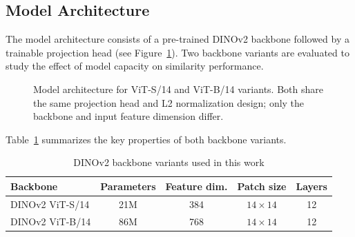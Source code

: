 \documentclass[
    english,
]{VUMIFPSbakalaurinis}
\begin{document}
\subsection{Model Architecture}

The model architecture consists of a pre-trained DINOv2 backbone followed by a trainable projection head (see Figure~\ref{fig:architecture}). Two backbone variants are evaluated to study the effect of model capacity on similarity performance.

\begin{figure}[H]
\centering
{}
\caption{Model architecture for ViT-S/14 and ViT-B/14 variants. Both share the same projection head and L2 normalization design; only the backbone and input feature dimension differ.}
\label{fig:architecture}
\end{figure}

Table~\ref{tab:backbone_comparison} summarizes the key properties of both backbone variants.

\begin{table}[H]
\centering
\caption{DINOv2 backbone variants used in this work}
\label{tab:backbone_comparison}
\begin{tabular}{lcccc}
\toprule
\textbf{Backbone} & \textbf{Parameters} & \textbf{Feature dim.} & \textbf{Patch size} & \textbf{Layers} \\
\midrule
DINOv2 ViT-S/14 & 21M & 384 & $14 \times 14$ & 12 \\
DINOv2 ViT-B/14 & 86M & 768 & $14 \times 14$ & 12 \\
\bottomrule
\end{tabular}
\end{table}
\end{document}
